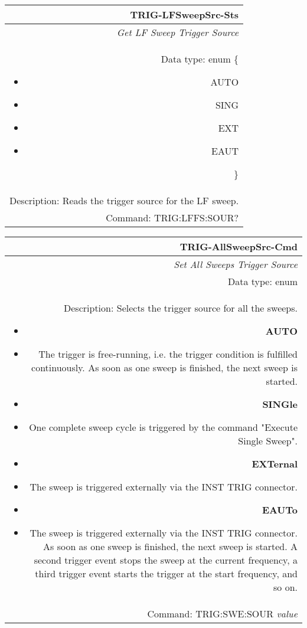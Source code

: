 \documentclass[openany]{article}
\begin{document}
		\begin{tabular}{N}
			\hline
			\bfseries TRIG-LFSweepSrc-Sts \\ \hline
			\emph{Get LF Sweep Trigger Source} \\
			Data type: enum \{\begin{itemize}[noitemsep]
				\small
				\item[] AUTO
				\item[] SING
				\item[] EXT
				\item[] EAUT
			\end{itemize}\} \\ 
			Description: Reads the trigger source for the LF sweep. \\
			Command: TRIG:LFFS:SOUR? \\

		\end{tabular}
%
		\begin{tabular}{N}
			\hline
			\bfseries TRIG-AllSweepSrc-Cmd \\ \hline
			\emph{Set All Sweeps Trigger Source} \\
			Data type: enum \\   
			Description: Selects the trigger source for all the sweeps.\begin{itemize}[noitemsep]
				\small
				\item[] \textbf{AUTO}
				\item[] The trigger is free-running, i.e. the trigger condition is fulfilled continuously. As soon as one sweep is finished, the next sweep is started.
                                \item[] \textbf{SINGle}
				\item[] One complete sweep cycle is triggered by the command "Execute Single Sweep".
				\item[] \textbf{EXTernal}
				\item[] The sweep is triggered externally via the INST TRIG connector.
                                \item[] \textbf{EAUTo}
				\item[] The sweep is triggered externally via the INST TRIG connector. As soon as one sweep is finished, the next sweep is started. A second trigger event stops the sweep at the current frequency, a third trigger event starts the trigger at the start frequency, and so on.

			\end{itemize} \\
			Command: TRIG:SWE:SOUR \emph{value} \\

		\end{tabular}
\end{document}
